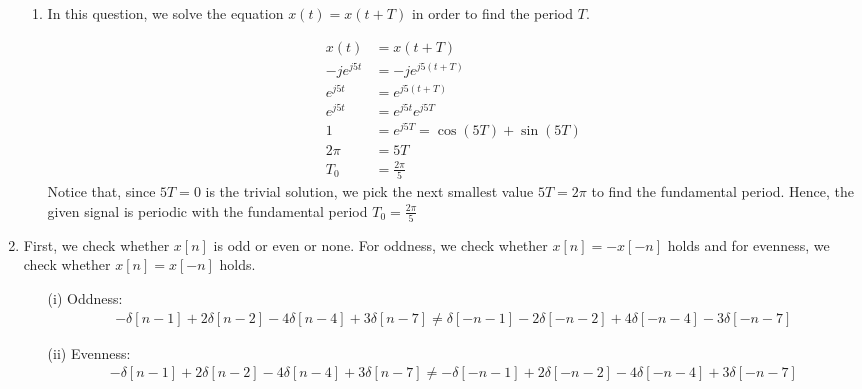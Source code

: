 \documentclass[10pt,a4paper, margin=1in]{article}
\begin{document}
\begin{enumerate}
\begin{enumerate}
    \item %
    In this question, we solve the equation $x(t) = x(t + T)$ in order to find the period $T$.

    	\begin{equation}
	\begin{split}
		x(t) & = x(t + T)\\
		-je^{j5t} & = -je^{j5(t + T)}\\
		e^{j5t} & = e^{j5(t + T)}\\
		e^{j5t} & = e^{j5t} e^{j5T}\\
		1 & = e^{j5T} = \cos{(5T)} + \sin{(5T)}\\
		2 \pi & = 5T\\
		T_0 & = \frac{2 \pi}{5}
	\end{split}
	\end{equation}
    	Notice that, since $5T = 0$ is the trivial solution, we pick the next smallest value $5T = 2 \pi$ to find the fundamental period. Hence, the given signal is periodic with the fundamental period $T_0 = \frac{2 \pi}{5}$
    \end{enumerate}

\item %
First, we check whether $x[n]$ is odd or even or none. For oddness, we check whether $x[n] = - x[-n]$ holds and for evenness, we check whether $x[n] = x[-n]$ holds.
	\begin{itemize}
		\item[(i)] Oddness:
			\begin{equation}
			\begin{split}
				-\delta[n - 1] + 2\delta[n - 2] -4\delta[n-4] + 3\delta[n-7] \not= \delta[-n - 1] - 2\delta[-n - 2] + 4\delta[-n-4] - 3\delta[-n-7]
			\end{split}
			\end{equation}
		\item[(ii)] Evenness:
			\begin{equation}
			\begin{split}
				-\delta[n - 1] + 2\delta[n - 2] -4\delta[n-4] + 3\delta[n-7] \not= -\delta[-n - 1] + 2\delta[-n - 2] - 4\delta[-n-4] + 3\delta[-n-7]
			\end{split}
			\end{equation}
	\end{itemize}
	

\end{enumerate}
\end{document}
